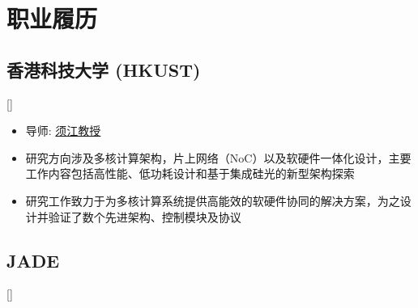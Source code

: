 \documentclass{mycv}
\begin{document}
\maketitle%

%
%

\section{职业履历}

\subsection{香港科技大学 (HKUST)}[]
\begin{positions}
\end{positions}

\begin{itemize}
  \item 导师: \href{https://eexu.home.ece.ust.hk/}{须江教授}
  \item 研究方向涉及多核计算架构，片上网络（NoC）以及软硬件一体化设计，主要工作内容包括高性能、低功耗设计和基于集成硅光的新型架构探索
  \item 研究工作致力于为多核计算系统提供高能效的软硬件协同的解决方案，为之设计并验证了数个先进架构、控制模块及协议
\end{itemize}

\subsection{JADE}[]
\begin{positions}
\end{positions}
\end{document}
